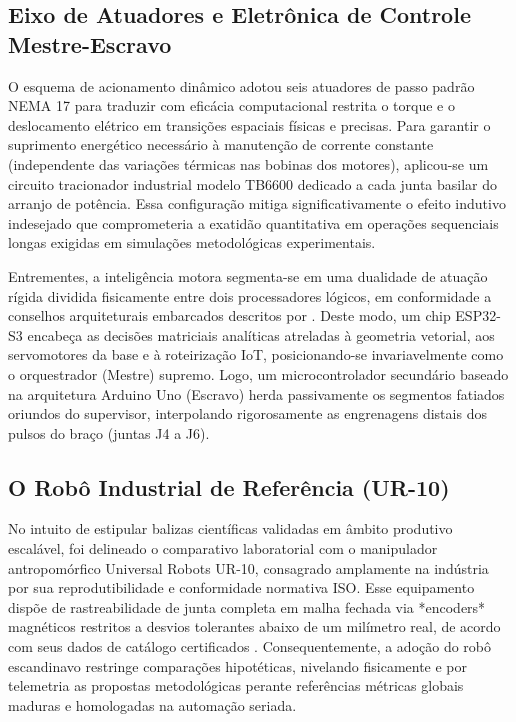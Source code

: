 \subsection{Eixo de Atuadores e Eletrônica de Controle Mestre-Escravo}

O esquema de acionamento dinâmico adotou seis atuadores de passo padrão NEMA 17 para traduzir com eficácia computacional restrita o torque e o deslocamento elétrico em transições espaciais físicas e precisas. Para garantir o suprimento energético necessário à manutenção de corrente constante (independente das variações térmicas nas bobinas dos motores), aplicou-se um circuito tracionador industrial modelo TB6600 dedicado a cada junta basilar do arranjo de potência. Essa configuração mitiga significativamente o efeito indutivo indesejado que comprometeria a exatidão quantitativa em operações sequenciais longas exigidas em simulações metodológicas experimentais.

Entrementes, a inteligência motora segmenta-se em uma dualidade de atuação rígida dividida fisicamente entre dois processadores lógicos, em conformidade a conselhos arquiteturais embarcados descritos por . Deste modo, um chip ESP32-S3 encabeça as decisões matriciais analíticas atreladas à geometria vetorial, aos servomotores da base e à roteirização IoT, posicionando-se invariavelmente como o orquestrador (Mestre) supremo. Logo, um microcontrolador secundário baseado na arquitetura Arduino Uno (Escravo) herda passivamente os segmentos fatiados oriundos do supervisor, interpolando rigorosamente as engrenagens distais dos pulsos do braço (juntas J4 a J6).

\subsection{O Robô Industrial de Referência (UR-10)}

No intuito de estipular balizas científicas validadas em âmbito produtivo escalável, foi delineado o comparativo laboratorial com o manipulador antropomórfico Universal Robots UR-10, consagrado amplamente na indústria por sua reprodutibilidade e conformidade normativa ISO. Esse equipamento dispõe de rastreabilidade de junta completa em malha fechada via *encoders* magnéticos restritos a desvios tolerantes abaixo de um milímetro real, de acordo com seus dados de catálogo certificados \cite{universalrobots2023}. Consequentemente, a adoção do robô escandinavo restringe comparações hipotéticas, nivelando fisicamente e por telemetria as propostas metodológicas perante referências métricas globais maduras e homologadas na automação seriada.

